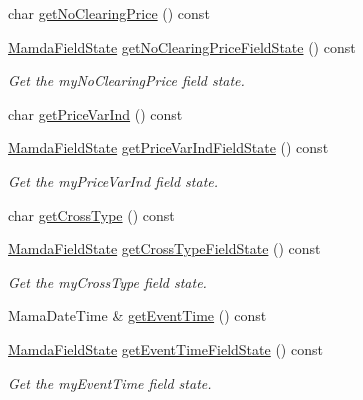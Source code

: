 \begin{CompactItemize}
char \hyperlink{classWombat_1_1MamdaOrderImbalanceListener_c9c3e649371b664623b47f1153927024}{get\-No\-Clearing\-Price} () const 
\item 
\hyperlink{namespaceWombat_93aac974f2ab713554fd12a1fa3b7d2a}{Mamda\-Field\-State} \hyperlink{classWombat_1_1MamdaOrderImbalanceListener_c0d44a700d7ff3107cd46c0531c4634f}{get\-No\-Clearing\-Price\-Field\-State} () const 
\begin{CompactList}\small\item\em Get the my\-No\-Clearing\-Price field state. \item\end{CompactList}\item 
char \hyperlink{classWombat_1_1MamdaOrderImbalanceListener_dcb92d290caa24fbf12d5521f5917fe4}{get\-Price\-Var\-Ind} () const 
\item 
\hyperlink{namespaceWombat_93aac974f2ab713554fd12a1fa3b7d2a}{Mamda\-Field\-State} \hyperlink{classWombat_1_1MamdaOrderImbalanceListener_b59ba04652f3f591eab16bd569caa711}{get\-Price\-Var\-Ind\-Field\-State} () const 
\begin{CompactList}\small\item\em Get the my\-Price\-Var\-Ind field state. \item\end{CompactList}\item 
char \hyperlink{classWombat_1_1MamdaOrderImbalanceListener_068ff249e302d5490189e747622fae22}{get\-Cross\-Type} () const 
\item 
\hyperlink{namespaceWombat_93aac974f2ab713554fd12a1fa3b7d2a}{Mamda\-Field\-State} \hyperlink{classWombat_1_1MamdaOrderImbalanceListener_ad35a45f28ab61abc265d15c76a26c37}{get\-Cross\-Type\-Field\-State} () const 
\begin{CompactList}\small\item\em Get the my\-Cross\-Type field state. \item\end{CompactList}\item 
Mama\-Date\-Time \& \hyperlink{classWombat_1_1MamdaOrderImbalanceListener_6cac146703cca68aecfd579f512d8b99}{get\-Event\-Time} () const 
\item 
\hyperlink{namespaceWombat_93aac974f2ab713554fd12a1fa3b7d2a}{Mamda\-Field\-State} \hyperlink{classWombat_1_1MamdaOrderImbalanceListener_b9da1457422c7e005b4d1cb097621e01}{get\-Event\-Time\-Field\-State} () const 
\begin{CompactList}\small\item\em Get the my\-Event\-Time field state. \item\end{CompactList}\item 

\end{CompactItemize}
